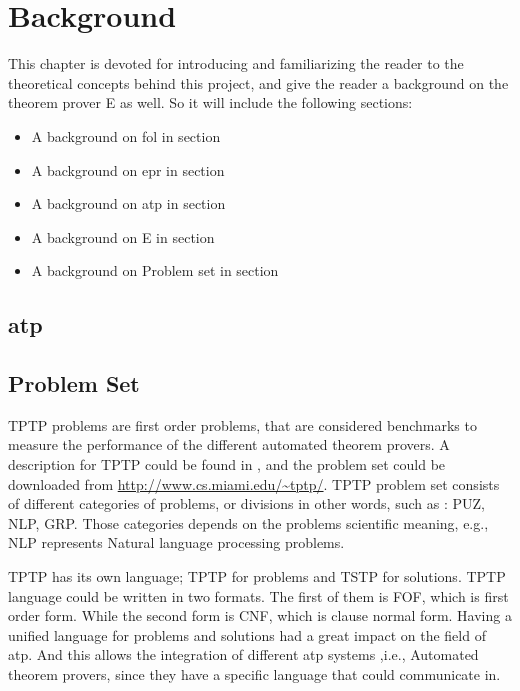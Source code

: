 \chapter{Background}\label{chap:background}


This chapter is devoted for introducing and familiarizing the reader to the theoretical concepts behind this project, and give the reader a background on the theorem prover E as well. So it will include the following sections:
	\begin{itemize}
		\item A background on \ac{fol} in section %
		\item A background on \ac{epr} in section %
		\item A background on \ac{atp} in section %
		\item A background on E in section %
		\item A background on Problem set in section %
	\end{itemize}






\section{\acf{atp}}







\section{Problem Set}
TPTP problems are first order problems, that are considered benchmarks to measure the performance of the different automated theorem provers. A description for TPTP could be found in \cite{TPTP09}, and the problem set could be downloaded from \url{http://www.cs.miami.edu/~tptp/}. TPTP problem set consists of different categories of problems, or divisions in other words, such as : PUZ, NLP, GRP. Those categories depends on the problems scientific meaning, e.g., NLP represents Natural language processing problems.


TPTP has its own language; TPTP for problems and TSTP for solutions. TPTP language could be written in two formats. The first of them is FOF, which is first order form. While the second form is CNF, which is clause normal form. Having a unified language for problems and solutions had a great impact on the field of \ac{atp}. And this allows the integration of different \ac{atp} systems ,i.e., Automated theorem provers, since they have a specific language that could communicate in.  


